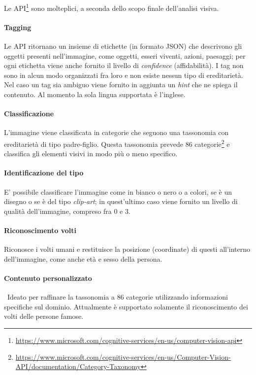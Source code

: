 \documentclass[fleqn,a4paper,11pt]{report}
\begin{document}
Le API\footnote{\url{https://www.microsoft.com/cognitive-services/en-us/computer-vision-api}} sono molteplici, a seconda dello scopo finale dell'analisi visiva.

\paragraph{Tagging} Le API ritornano un insieme di etichette (in formato JSON) che descrivono gli oggetti presenti nell'immagine, come oggetti, esseri viventi, azioni, paesaggi; per ogni etichetta viene anche fornito il livello di \textit{confidence} (affidabilità). I tag non sono in alcun modo organizzati fra loro e non esiste nessun tipo di ereditarietà.
Nel caso un tag sia ambiguo viene fornito in aggiunta un \textit{hint} che ne spiega il contenuto.
Al momento la sola lingua supportata è l'inglese.

\paragraph{Classificazione} L'immagine viene classificata in categorie che seguono una tassonomia con ereditarietà di tipo padre-figlio. Questa tassonomia prevede 86 categorie\footnote{\url{https://www.microsoft.com/cognitive-services/en-us/Computer-Vision-API/documentation/Category-Taxonomy}} e classifica gli elementi visivi in modo più o meno specifico.

\paragraph{Identificazione del tipo} E' possibile classificare l'immagine come in bianco o nero o a colori, se è un disegno o se è del tipo \textit{clip-art}; in quest'ultimo caso viene fornito un livello di qualità dell'immagine, compreso fra 0 e 3.

\paragraph{Riconoscimento volti} Riconosce i volti umani e restituisce la posizione (coordinate) di questi all'interno dell'immagine, come anche età e sesso della persona.

\paragraph{Contenuto personalizzato} Ideato per raffinare la tassonomia a 86 categorie utilizzando informazioni specifiche sul dominio. Attualmente è supportato solamente il riconoscimento dei volti delle persone famose.
\end{document}
